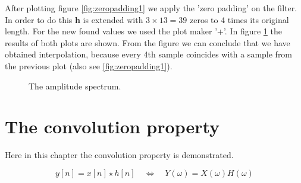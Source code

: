 \documentclass[final]{scrreprt} %
\begin{document}
After plotting figure \ref{fig:zeropadding1} we apply the 'zero padding' on the filter. 
In order to do this \textbf{h} is extended with $3\times 13 = 39$ zeros to 4 times its original length.
For the new found values we used the plot maker '+'.
In figure \ref{fig:zeropadding2} the results of both plots are shown. 
From the figure we can conclude that we have obtained interpolation, because every 4th sample coincides with a sample from the previous plot (also see \ref{fig:zeropadding1}).

\begin{figure}[H]
	\centering
	\setlength\figureheight{6cm}
  	\setlength\figurewidth{10cm}
	
	\caption{The amplitude spectrum.}
	\label{fig:zeropadding2}
\end{figure}


\section{The convolution property}
Here in this chapter the convolution property is demonstrated. 




\begin{equation}
y[n] = x[n]\star h[n] \quad \Leftrightarrow \quad Y(\omega) = X(\omega)H(\omega) 
\label{equ:convprop}
\end{equation}
\end{document}
